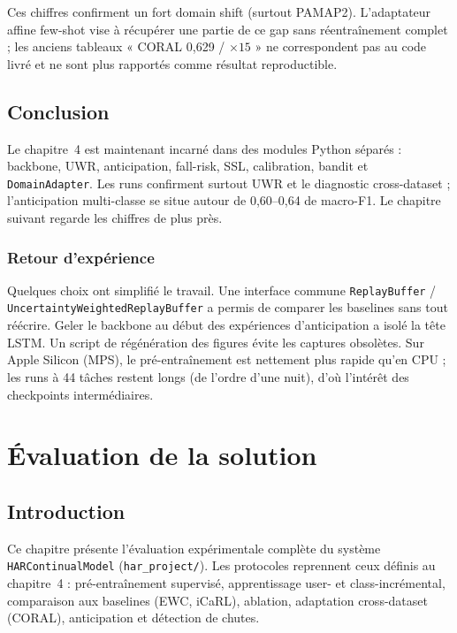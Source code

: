 \documentclass[a4paper,12pt]{report}
\begin{document}
Ces chiffres confirment un fort domain shift (surtout PAMAP2). L'adaptateur
affine few-shot vise à récupérer une partie de ce gap sans réentraînement
complet ; les anciens tableaux « CORAL 0,629 / $\times 15$ » ne correspondent
pas au code livré et ne sont plus rapportés comme résultat reproductible.

\section{Conclusion}

Le chapitre~4 est maintenant incarné dans des modules Python séparés : backbone,
UWR, anticipation, fall-risk, SSL, calibration, bandit et
\texttt{DomainAdapter}. Les runs confirment surtout UWR et le diagnostic
cross-dataset ; l'anticipation multi-classe se situe autour de 0,60--0,64 de
macro-F1. Le chapitre suivant regarde les chiffres de plus près.

\subsection{Retour d'expérience}

Quelques choix ont simplifié le travail. Une interface commune
\texttt{ReplayBuffer} / \texttt{UncertaintyWeightedReplayBuffer} a permis de
comparer les baselines sans tout réécrire. Geler le backbone au début des
expériences d'anticipation a isolé la tête LSTM. Un script de régénération
des figures évite les captures obsolètes. Sur Apple Silicon (MPS), le
pré-entraînement est nettement plus rapide qu'en CPU ; les runs à 44 tâches
restent longs (de l'ordre d'une nuit), d'où l'intérêt des checkpoints
intermédiaires.



\clearpage
\chapter{Évaluation de la solution}
\label{ch:11-Evaluation}

\section{Introduction}

Ce chapitre présente l'évaluation expérimentale complète du système
\texttt{HARContinualModel} (\texttt{har\_project/}). Les protocoles reprennent
ceux définis au chapitre~4 : pré-entraînement supervisé, apprentissage
user- et class-incrémental, comparaison aux baselines (EWC, iCaRL), ablation,
adaptation cross-dataset (CORAL), anticipation et détection de chutes.
\end{document}
